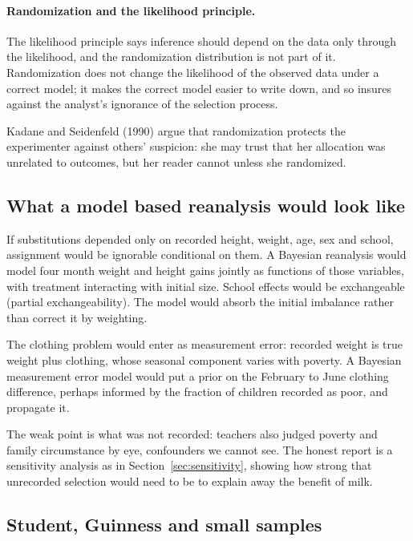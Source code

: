 \paragraph{Randomization and the likelihood principle.} The likelihood principle says inference should depend on the data only through the likelihood, and the randomization distribution is not part of it. Randomization does not change the likelihood of the observed data under a correct model; it makes the correct model easier to write down, and so insures against the analyst's ignorance of the selection process.

Kadane and Seidenfeld (1990) argue that randomization protects the experimenter against others' suspicion: she may trust that her allocation was unrelated to outcomes, but her reader cannot unless she randomized.

\subsection{What a model based reanalysis would look like}

If substitutions depended only on recorded height, weight, age, sex and school, assignment would be ignorable conditional on them. A Bayesian reanalysis would model four month weight and height gains jointly as functions of those variables, with treatment interacting with initial size. School effects would be exchangeable (partial exchangeability). The model would absorb the initial imbalance rather than correct it by weighting.

The clothing problem would enter as measurement error: recorded weight is true weight plus clothing, whose seasonal component varies with poverty. A Bayesian measurement error model would put a prior on the February to June clothing difference, perhaps informed by the fraction of children recorded as poor, and propagate it.

The weak point is what was not recorded: teachers also judged poverty and family circumstance by eye, confounders we cannot see. The honest report is a sensitivity analysis as in Section~\ref{sec:sensitivity}, showing how strong that unrecorded selection would need to be to explain away the benefit of milk.

\subsection{Student, Guinness and small samples}

